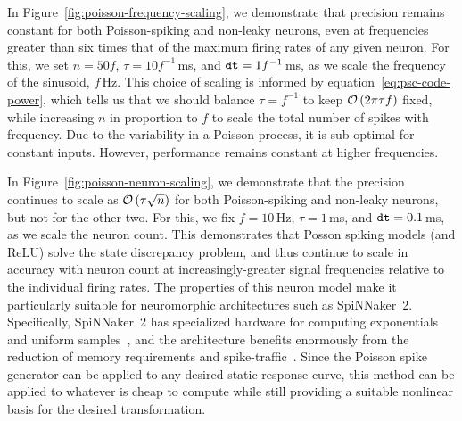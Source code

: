 In Figure~\ref{fig:poisson-frequency-scaling}, we demonstrate that precision remains constant for both Poisson-spiking and non-leaky neurons, even at frequencies greater than six times that of the maximum firing rates of any given neuron.
For this, we set $n = 50 f$, $\tau = 10 f^{-1}$\,ms, and $\texttt{dt}{} = 1 f^{-1}$\,ms, as we scale the frequency of the sinusoid, $f$\,Hz.
This choice of scaling is informed by equation~\ref{eq:psc-code-power}, which tells us that we should balance $\tau = f^{-1}$ to keep $\mathcal{O}\left({2 \pi \tau f }\right)$ fixed, while increasing $n$ in proportion to $f$ to scale the total number of spikes with frequency.
Due to the variability in a Poisson process, it is sub-optimal for constant inputs.
However, performance remains constant at higher frequencies.

In Figure~\ref{fig:poisson-neuron-scaling}, we demonstrate that the precision continues to scale as $\mathcal{O}\left({\tau \sqrt{n}}\right)$ for both Poisson-spiking and non-leaky neurons, but not for the other two.
For this, we fix $f = 10$\,Hz, $\tau = 1$\,ms, and $\texttt{dt}{} = 0.1$\,ms, as we scale the neuron count.
This demonstrates that Posson spiking models (and ReLU) solve the state discrepancy problem, and thus continue to scale in accuracy with neuron count at increasingly-greater signal frequencies relative to the individual firing rates.
The properties of this neuron model make it particularly suitable for neuromorphic architectures such as SpiNNaker~2.
Specifically, SpiNNaker~2 has specialized hardware for computing exponentials~\citep{partzsch2017fixed} and uniform samples~\citep{liu2018memory}, and the architecture benefits enormously from the reduction of memory requirements and spike-traffic~\citep{stromatias2013power, mundy2015}.
Since the Poisson spike generator can be applied to any desired static response curve, this method can be applied to whatever is cheap to compute while still providing a suitable nonlinear basis for the desired transformation.

